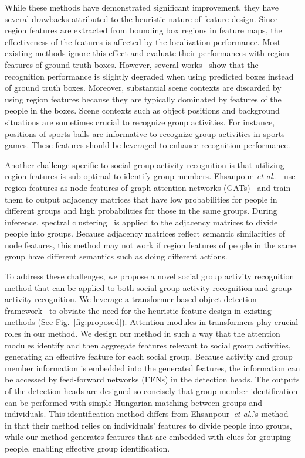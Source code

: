\documentclass[runningheads]{llncs}
\makeatletter
\DeclareRobustCommand\onedot{\futurelet\@let@token\@onedot}
\def\@onedot{\ifx\@let@token.\else.\null\fi\xspace}
\def\etal{\emph{et al}\onedot}
\makeatother
\begin{document}
While these methods have demonstrated significant improvement, they have several drawbacks attributed to the heuristic nature of feature design.
Since region features are extracted from bounding box regions in feature maps, the effectiveness of the features is affected by the localization performance. Most existing methods ignore this effect and evaluate their performances with region features of ground truth boxes. However, several works~\cite{bagautdinov_cvpr2017,qi_eccv2018,wu_cvpr2019,ehsanpour_eccv2020} show that the recognition performance is slightly degraded when using predicted boxes instead of ground truth boxes.
Moreover, substantial scene contexts are discarded by using region features because they are typically dominated by features of the people in the boxes. Scene contexts such as object positions and background situations are sometimes crucial to recognize group activities. For instance, positions of sports balls are informative to recognize group activities in sports games. These features should be leveraged to enhance recognition performance.

Another challenge specific to social group activity recognition is that utilizing region features is sub-optimal to identify group members. Ehsanpour~\etal~\cite{ehsanpour_eccv2020} use region features as node features of graph attention networks (GATs)~\cite{velickovic_iclr2018} and train them to output adjacency matrices that have low probabilities for people in different groups and high probabilities for those in the same groups. During inference, spectral clustering~\cite{ng_nips2002} is applied to the adjacency matrices to divide people into groups. Because adjacency matrices reflect semantic similarities of node features, this method may not work if region features of people in the same group have different semantics such as doing different actions.

To address these challenges, we propose a novel social group activity recognition method that can be applied to both social group activity recognition and group activity recognition. We leverage a transformer-based object detection framework~\cite{carion_eccv2020,zhu_iclr2021} to obviate the need for the heuristic feature design in existing methods (See Fig.~\ref{fig:proposed}).
Attention modules in transformers play crucial roles in our method. We design our method in such a way that the attention modules identify and then aggregate features relevant to social group activities, generating an effective feature for each social group. Because activity and group member information is embedded into the generated features, the information can be accessed by feed-forward networks (FFNs) in the detection heads. The outputs of the detection heads are designed so concisely that group member identification can be performed with simple Hungarian matching between groups and individuals. This identification method differs from Ehsanpour~\etal's method~\cite{ehsanpour_eccv2020} in that their method relies on individuals' features to divide people into groups, while our method generates features that are embedded with clues for grouping people, enabling effective group identification.
\end{document}
